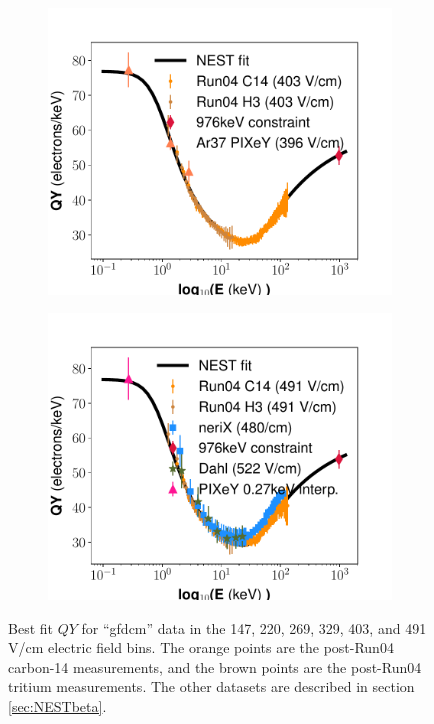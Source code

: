 \begin{figure}[h!]
\begin{subfigure}{0.5\textwidth}
  \centering
  \includegraphics[width=\textwidth]{Figures/Yields_fit_old/NEST_fit_403Vcm_old.pdf}
  \caption{}
\end{subfigure}%
\begin{subfigure}{0.5\textwidth}
  \centering
  \includegraphics[width=\textwidth]{Figures/Yields_fit_old/NEST_fit_491Vcm_old.pdf}
  \caption{}
\end{subfigure}
\caption{Best fit $QY$ for ``gfdcm'' data in the 147, 220, 269, 329, 403, and 491 V/cm electric field bins. The orange points are the post-Run04 carbon-14 measurements, and the brown points are the post-Run04 tritium measurements. The other datasets are described in section \ref{sec:NESTbeta}.}
\label{fig:gfdcm_prelim_QY2}
\end{figure}

